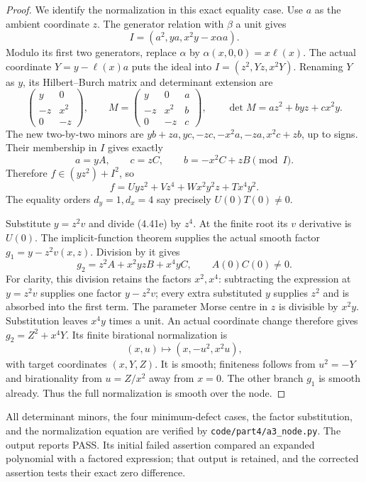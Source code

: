 \begin{proof}
We identify the normalization in this exact equality case.
Use $a$ as the ambient coordinate $z$. The generator relation
with $\beta$ a unit gives
\[
                    I=(a^2,ya,x^2y-x\alpha a).
\]
Modulo its first two generators, replace $\alpha$ by
$\alpha(x,0,0)=x\ell(x)$. The actual coordinate
$Y=y-\ell(x)a$ puts the ideal into
$I=(z^2,Yz,x^2Y)$. Renaming $Y$ as $y$, its Hilbert--Burch
matrix and determinant extension are
\[
 \begin{pmatrix}y&0\\-z&x^2\\0&-z\end{pmatrix},
 \qquad
 M=\begin{pmatrix}y&0&a\\-z&x^2&b\\0&-z&c\end{pmatrix},
 \qquad
 \det M=az^2+byz+cx^2y.
\]
The new two-by-two minors are
$yb+za,yc,-zc,-x^2a,-za,x^2c+zb$, up to signs.
Their membership in $I$ gives exactly
\[
             a=yA,\qquad c=zC,\qquad b=-x^2C+zB
                          \pmod I.
\]
Therefore $f\in(yz^2)+I^2$, so
\[
           f=Uyz^2+Vz^4+Wx^2y^2z+Tx^4y^2.            \tag{4.41e}
\]
The equality orders $d_y=1,d_x=4$ say precisely
$U(0)T(0)\ne0$.

Substitute $y=z^2v$ and divide (4.41e) by $z^4$.
At the finite root its $v$ derivative is $U(0)$.
The implicit-function theorem supplies the actual smooth
factor $g_1=y-z^2v(x,z)$. Division by it gives
\[
                  g_2=z^2A+x^2yzB+x^4yC,
                  \qquad A(0)C(0)\ne0.
\]
For clarity, this division retains the factors $x^2,x^4$:
subtracting the expression at $y=z^2v$ supplies one factor
$y-z^2v$; every extra substituted $y$ supplies $z^2$ and
is absorbed into the first term. The parameter Morse
centre in $z$ is divisible by $x^2y$. Substitution leaves
$x^4y$ times a unit. An actual coordinate change therefore
gives $g_2=Z^2+x^4Y$. Its finite birational normalization is
\[
                 (x,u)\longmapsto(x,-u^2,x^2u),
\]
with target coordinates $(x,Y,Z)$. It is smooth; finiteness
follows from $u^2=-Y$ and birationality from $u=Z/x^2$
away from $x=0$. The other branch $g_1$ is smooth already.
Thus the full normalization is smooth over the node.
\end{proof}

All determinant minors, the four minimum-defect cases,
the factor substitution, and the normalization equation
are verified by \texttt{code/part4/a3\_node.py}.
The output reports PASS. Its initial failed assertion
compared an expanded polynomial with a factored expression;
that output is retained, and the corrected assertion tests
their exact zero difference.

